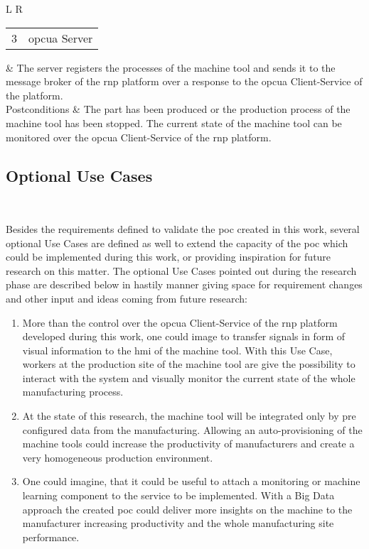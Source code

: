 \documentclass[
a4paper,
twoside,
headsepline,
cleardoublepage=empty,
parskip=half,
draft=false
]{scrbook}
\begin{document}
\begin{table}[hbtp]
\begin{tabular}{L R}
						\\ \midrule
						\begin{tabular}{c c} 3 & \gls{opcua} Server \end{tabular} & The server registers the processes of the machine tool and sends it to the message broker of the \gls{rnp} platform over a response to the \gls{opcua} Client-Service of the platform.
						\\ \midrule
						Postconditions & The part has been produced or the production process of the machine tool has been stopped. The current state of the machine tool can be monitored over the \gls{opcua} Client-Service of the \gls{rnp} platform.
						\\ \bottomrule
					\end{tabular}
				\end{table}

			\subsection{Optional Use Cases} \label{subsec:optional}

				Besides the requirements defined to validate the \gls{poc} created in this work, several optional Use Cases are defined as well to extend the capacity of the \gls{poc} which could be implemented during this work, or providing inspiration for future research on this matter.
				The optional Use Cases pointed out during the research phase are described below in hastily manner giving space for requirement changes and other input and ideas coming from future research:

				\begin{enumerate}

					\item More than the control over the \gls{opcua} Client-Service of the \gls{rnp} platform developed during this work, one could image to transfer signals in form of visual information to the \gls{hmi} of the machine tool. With this Use Case, workers at the production site of the machine tool are give the possibility to interact with the system and visually monitor the current state of the whole manufacturing process.

					\item At the state of this research, the machine tool will be integrated only by pre configured data from the manufacturing. 
					Allowing an auto-provisioning of the machine tools could increase the productivity of manufacturers and create a very homogeneous production environment.

					\item One could imagine, that it could be useful to attach a monitoring or machine learning component to the service to be implemented. With a Big Data approach the created \gls{poc} could deliver more insights on the machine to the manufacturer increasing productivity and the whole manufacturing site performance.

				\end{enumerate}
\end{document}

